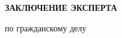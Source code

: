 %
%
%
\noindent %
\vspace{40mm}
%

%
%
%
\begin{center}
	\LARGE\textbf{ ЗАКЛЮЧЕНИЕ ЭКСПЕРТА}
	\bigskip\\[0mm]
\end{center}
\par
\vspace{-3mm}\noindent по гражданскому делу \delonum \, \isk \\[0mm]

